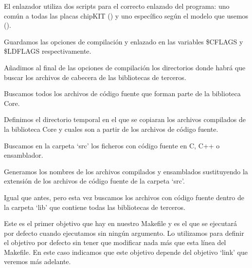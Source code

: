  
 El enlazador utiliza dos scripts para el correcto enlazado del programa: uno común a todas las placas chipKIT () y uno específico según el modelo que usemos ().
 
 
 Guardamos las opciones de compilación y enlazado en las variables \$CFLAGS y \$LDFLAGS respectivamente.
 
 
 Añadimos al final de las opciones de compilación los directorios donde habrá que buscar los archivos de cabecera de las bibliotecas de terceros.


Buscamos todos los archivos de código fuente que forman parte de la biblioteca Core.
 

 Definimos el directorio temporal en el que se copiaran los archivos compilados de la biblioteca Core y cuales son a partir de los archivos de código fuente.
 
 
 Buscamos en la carpeta `src' los ficheros con código fuente en C, C++ o ensamblador.

 
 Generamos los nombres de los archivos compilados y ensamblados sustituyendo la extensión de los archivos de código fuente de la carpeta `src'.
 
 
 Igual que antes, pero esta vez buscamos los archivos con código fuente dentro de la carpeta `lib' que contiene todas las bibliotecas de terceros.
 
 
 Este es el primer objetivo que hay en nuestro Makefile y es el que se ejecutará por defecto cuando ejecutamos  sin ningún argumento. Lo utilizamos para definir el objetivo por defecto sin tener que modificar nada más que esta línea del Makefile. En este caso indicamos que este objetivo depende del objetivo `link' que veremos más adelante.
 
